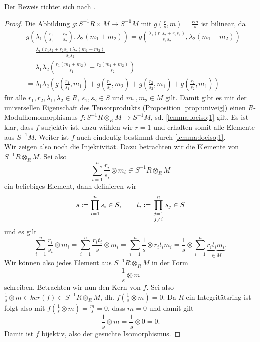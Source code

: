 \documentclass[11pt,titlepage]{article}
\theoremstyle{definition}
\theoremstyle{remark}
\begin{document}
	Der Beweis richtet sich nach \cite[Proposition 3.5]{introductiontocomalg}.
	
	\begin{proof}
		Die Abbildung $g:S^{-1}R\times M\to S^{-1}M$ mit $g\left(\frac{r}{s},m\right)=\frac{rm}{s}$ ist bilinear, da 
		\begin{align*}
			&g\left(\lambda_1\left(\frac{r_1}{s_1}+\frac{r_2}{s_2}\right),
			\lambda_2 (m_1+m_2)\right)=g\left(\frac{\lambda_1 (r_1 s_2+r_2
			 s_1)}{s_1s_2},\lambda_2(m_1+m_2)\right) \\
			&=\frac{\lambda_1(r_1s_2+r_2s_1)\lambda_2(m_1+m_2)}{s_1s_2}\\
			&=\lambda_1\lambda_2\left(\frac{r_1(m_1+m_2)}{s_1}+
			\frac{r_2(m_1+m_2)}{s_2}\right) \\
			&=\lambda_1\lambda_2 \left(g\left(\frac{r_1}{s_1},m_1\right)
			+g\left(\frac{r_1}{s_1},m_2\right)+g\left(\frac{r_2}{s_2},m_1\right)+
			g\left(\frac{r_2}{s_2},m_1\right)\right)
		\end{align*}
		für alle $r_1,r_2,\lambda_1,\lambda_2\in R$, $s_1,s_2 \in S$ und 
		$m_1,m_2\in M$ gilt. Damit gibt es mit der universellen Eigenschaft 
		des Tensorprodukts (Proposition \ref{prop:univeig}) einen 
		$R$-Modulhomomorphismus $f:S^{-1}R\otimes_R M\to S^{-1}M$, sd. 
		\ref{lemma:lociso;1} gilt. Es ist klar, dass $f$ surjektiv ist, 
		dazu wählen wir $r=1$ und erhalten somit alle Elemente aus 
		$S^{-1}M$. Weiter ist $f$ auch eindeutig bestimmt durch 
		\ref{lemma:lociso;1}. \\
		Wir zeigen also noch die Injektivität. Dazu betrachten wir die 
		Elemente von $S^{-1}R\otimes_R M$. Sei also 
		\[\sum_{i=1}^n \frac{r_i}{s_i}\otimes m_i \in S^{-1}R\otimes_R M\]
		ein beliebiges Element, dann definieren wir
		\[s:=\prod_{i=1}^n s_i\in S,\qquad t_i:=\prod_{\genfrac{}{}{0pt}{1}{j=1}{j\neq i}}^n s_j\in S\]
		und es gilt 
		\[\sum_{i=1}^n \frac{r_i}{s_i}\otimes m_i =
		\sum_{i=1}^n \frac{r_it_i}{s}\otimes m_i =\sum_{i=1}^n 
		\frac{1}{s}\otimes r_i t_i m_i =\frac{1}{s}\otimes\sum_{i=1}^n
		\underbrace{r_it_im_i}_{\in M}.\]
		Wir können also jedes Element aus $S^{-1}R\otimes_R M$ in der Form 
		\[\frac{1}{s}\otimes m\]
		schreiben. Betrachten wir nun den Kern von $f$. Sei also 
		$\frac{1}{s}\otimes m \in ker(f)\subset S^{-1}R\otimes_R M$, dh. 
		$f\left(\frac{1}{s}\otimes m\right)=0$. Da $R$ ein 
		Integritätsring ist folgt also mit $f\left(\frac{1}{s}\otimes m\right)=\frac{m}{s}=0$, dass $m=0$ und damit gilt
		\[\frac{1}{s}\otimes m =\frac{1}{s}\otimes 0=0.\]
		Damit ist $f$ bijektiv, also der gesuchte Isomorphismus.
	\end{proof}
	
\end{document}
